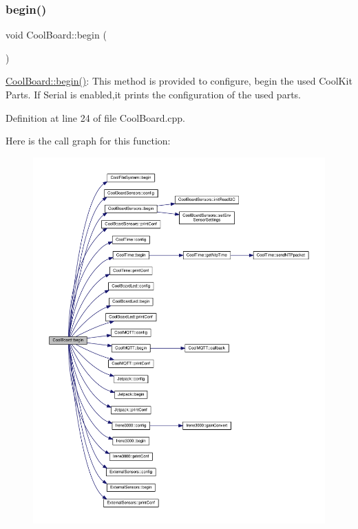 \subsubsection{\texorpdfstring{begin()}{begin()}}
{\footnotesize\ttfamily void Cool\+Board\+::begin (\begin{DoxyParamCaption}{ }\end{DoxyParamCaption})}

\hyperlink{class_cool_board_acba7c5aef7268b2c0044bdb54d3b9d76}{Cool\+Board\+::begin()}\+: This method is provided to configure, begin the used Cool\+Kit Parts. If Serial is enabled,it prints the configuration of the used parts. 

Definition at line 24 of file Cool\+Board.\+cpp.

Here is the call graph for this function\+:\nopagebreak
\begin{figure}[H]
\begin{center}
\leavevmode
\includegraphics[width=350pt]{class_cool_board_acba7c5aef7268b2c0044bdb54d3b9d76_cgraph}
\end{center}
\end{figure}
\mbox{\label{class_cool_board_a583a874c09c07e70a6eb9229fc4beddb}} 
